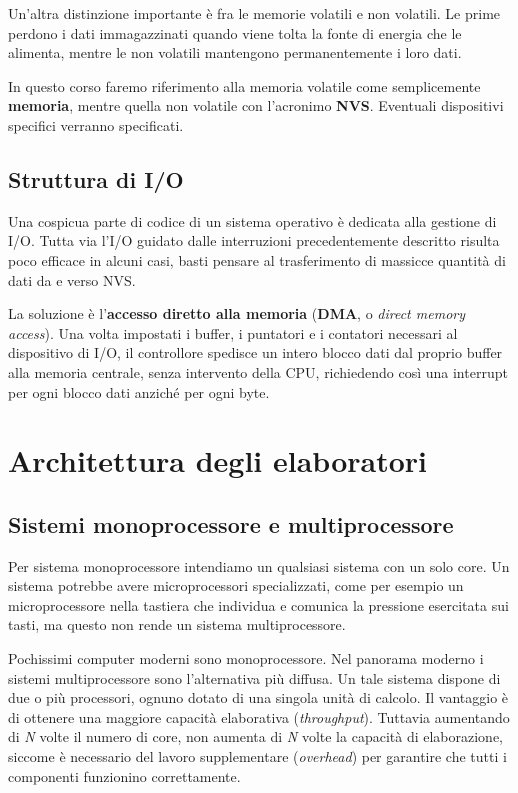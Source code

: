         Un'altra distinzione importante è fra le memorie volatili e non volatili. Le prime perdono i dati immagazzinati quando viene tolta la fonte di energia che le alimenta, mentre le non volatili mantengono permanentemente i loro dati.
        
        In questo corso faremo riferimento alla memoria volatile come semplicemente \textbf{memoria}, mentre quella non volatile con l'acronimo \textbf{NVS}. Eventuali dispositivi specifici verranno specificati.
        
    \subsection{Struttura di I/O}
        Una cospicua parte di codice di un sistema operativo è dedicata alla gestione di I/O. Tutta via l'I/O guidato dalle interruzioni precedentemente descritto risulta poco efficace in alcuni casi, basti pensare al trasferimento di massicce quantità di dati da e verso NVS.
        
        La soluzione è l'\textbf{accesso diretto alla memoria} (\textbf{DMA}, o \textit{direct memory access}). Una volta impostati i buffer, i puntatori e i contatori necessari al dispositivo di I/O, il controllore spedisce un intero blocco dati dal proprio buffer alla memoria centrale, senza intervento della CPU, richiedendo così una interrupt per ogni blocco dati anziché per ogni byte.
    
\section{Architettura degli elaboratori}
    \subsection{Sistemi monoprocessore e multiprocessore}
            Per sistema monoprocessore intendiamo un qualsiasi sistema con un solo core. Un sistema potrebbe avere microprocessori specializzati, come per esempio un microprocessore nella tastiera che individua e comunica la pressione esercitata sui tasti, ma questo non rende un sistema multiprocessore.
            
            Pochissimi computer moderni sono monoprocessore. Nel panorama moderno i sistemi multiprocessore sono l'alternativa più diffusa. Un tale sistema dispone di due o più processori, ognuno dotato di una singola unità di calcolo. Il vantaggio è di ottenere una maggiore capacità elaborativa (\textit{throughput}). Tuttavia aumentando di \textit{N} volte il numero di core, non aumenta di \textit{N} volte la capacità di elaborazione, siccome è necessario del lavoro supplementare (\textit{overhead}) per garantire che tutti i componenti funzionino correttamente.
            
